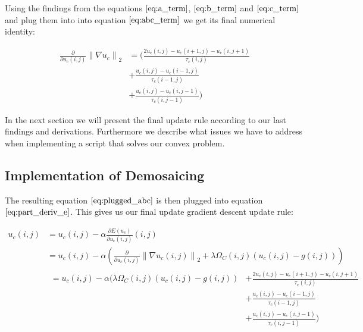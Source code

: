 \documentclass{paper}
\newcommand{\norm}[1]{\left\lVert#1\right\rVert}
\begin{document}
Using the findings from the equations $\ref{eq:a_term}$, $\ref{eq:b_term}$ and $\ref{eq:c_term}$ and plug them into into equation $\ref{eq:abc_term}$ we get its final numerical identity:

\begin{align}
\frac{\partial}{\partial u_{c}\left(i,j\right)} \norm{\nabla{u_c}}_2 
&= \Bigg(\frac{2 u_{c} \left(i,j\right) - u_{c} \left(i+1,j\right)-u_{c} \left(i,j+1\right)}{\tau_{c}\left(i,j\right)} \nonumber \\ 
&+ \frac{u_{c}\left(i,j\right) - u_{c}\left(i-1,j\right)}{\tau_{c}\left(i-1,j\right)} \nonumber \\
&+ \frac{u_{c}(i,j)-u_{c} \left(i,j-1\right)}{\tau_{c}\left(i,j-1\right)}\Bigg)
\label{eq:plugged_abc}	
\end{align}

In the next section we will present the final update rule according to our last findings and derivations. Furthermore we describe what issues we have to address when implementing a script that solves our convex problem.

\subsection{Implementation of Demosaicing}


The resulting equation $\ref{eq:plugged_abc}$ is then plugged into equation $\ref{eq:part_deriv_e}$. This gives us our final update gradient descent update rule:

\begin{align}
	u_{c} (i,j)
	&= u_{c}(i,j) - \alpha \frac{\partial{E(u_c)}}{\partial{u_{c} (i,j)}}(i,j) \nonumber \\
	&= u_{c}(i,j) - \alpha \left( \frac{\partial}{\partial{u_{c} (i,j)}} \norm{\nabla u_{c}(i,j)}_2 + \lambda \Omega_{C}(i,j) \left( u_{c}(i,j) - g(i,j) \right) \right) \nonumber \\
&\begin{aligned}
  =u_{c}(i,j) - \alpha \Bigg( \lambda \Omega_{C}(i,j) \left( u_{c}(i,j) - g(i,j) \right) &+ \frac{2 u_{c} \left(i,j\right) - u_{c} \left(i+1,j\right)-u_{c} \left(i,j+1\right)}{\tau_{c}\left(i,j\right)} \\
  &+ \frac{u_{c}\left(i,j\right) - u_{c}\left(i-1,j\right)}{\tau_{c}\left(i-1,j\right)} \\ 
  &+ \frac{u_{c}(i,j)-u_{c} \left(i,j-1\right)}{\tau_{c}\left(i,j-1\right)}\Bigg) \\
\end{aligned}
\label{eq:final_update_rule}
\end{align}
\end{document}
